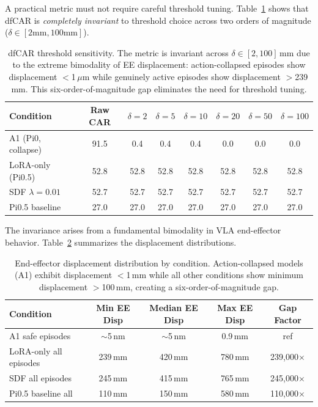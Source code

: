 \documentclass[letterpaper]{article}
\begin{document}
A practical metric must not require careful threshold tuning. Table~\ref{tab:dfcar-sensitivity} shows that dfCAR is \emph{completely invariant} to threshold choice across two orders of magnitude ($\delta \in [2\text{mm}, 100\text{mm}]$).

\begin{table}[t]
\centering
\caption{dfCAR threshold sensitivity. The metric is invariant across $\delta \in [2, 100]$\,mm due to the extreme bimodality of EE displacement: action-collapsed episodes show displacement $<$1\,$\mu$m while genuinely active episodes show displacement $>$239\,mm. This six-order-of-magnitude gap eliminates the need for threshold tuning.}
\label{tab:dfcar-sensitivity}
\begin{tabular}{lccccccc}
\toprule
Condition & Raw CAR & $\delta{=}2$ & $\delta{=}5$ & $\delta{=}10$ & $\delta{=}20$ & $\delta{=}50$ & $\delta{=}100$ \\
\midrule
A1 (Pi0, collapse) & 91.5 & 0.4 & 0.4 & 0.4 & 0.0 & 0.0 & 0.0 \\
LoRA-only (Pi0.5) & 52.8 & 52.8 & 52.8 & 52.8 & 52.8 & 52.8 & 52.8 \\
SDF $\lambda{=}0.01$ & 52.7 & 52.7 & 52.7 & 52.7 & 52.7 & 52.7 & 52.7 \\
Pi0.5 baseline & 27.0 & 27.0 & 27.0 & 27.0 & 27.0 & 27.0 & 27.0 \\
\bottomrule
\end{tabular}
\end{table}

The invariance arises from a fundamental bimodality in VLA end-effector behavior. Table~\ref{tab:ee-distribution} summarizes the displacement distributions.

\begin{table}[t]
\centering
\caption{End-effector displacement distribution by condition. Action-collapsed models (A1) exhibit displacement $<$1\,mm while all other conditions show minimum displacement $>$100\,mm, creating a six-order-of-magnitude gap.}
\label{tab:ee-distribution}
\begin{tabular}{lcccc}
\toprule
Condition & Min EE Disp & Median EE Disp & Max EE Disp & Gap Factor \\
\midrule
A1 safe episodes & ${\sim}$5\,nm & ${\sim}$5\,nm & 0.9\,mm & ref \\
LoRA-only all episodes & 239\,mm & 420\,mm & 780\,mm & 239{,}000$\times$ \\
SDF all episodes & 245\,mm & 415\,mm & 765\,mm & 245{,}000$\times$ \\
Pi0.5 baseline all & 110\,mm & 150\,mm & 580\,mm & 110{,}000$\times$ \\
\bottomrule
\end{tabular}
\end{table}
\end{document}
